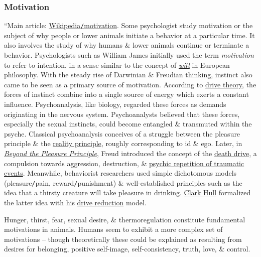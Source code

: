 \documentclass[oneside]{book}
\numberwithin{equation}{section}
\begin{document}
\subsubsection{Motivation}
``Main article: \href{https://en.wikipedia.org/wiki/Motivation}{Wikipedia\texttt{/}motivation}. Some psychologist study motivation or the subject of why people or lower animals initiate a behavior at a particular time. It also involves the study of why humans \& lower animals continue or terminate a behavior. Psychologists such as William James initially used the term \textit{motivation} to refer to intention, in a sense similar to the concept of \href{https://en.wikipedia.org/wiki/Will_(philosophy)}{\textit{will}} in European philosophy. With the steady rise of Darwinian \& Freudian thinking, instinct also came to be seen as a primary source of motivation. According to \href{https://en.wikipedia.org/wiki/Drive_theory}{drive theory}, the forces of instinct combine into a single source of energy which exerts a constant influence. Psychoanalysis, like biology, regarded these forces as demands originating in the nervous system. Psychoanalysts believed that these forces, especially the sexual instincts, could become entangled \& transmuted within the psyche. Classical psychoanalysis conceives of a struggle between the pleasure principle \& the \href{https://en.wikipedia.org/wiki/Reality_principle}{reality principle}, roughly corresponding to id \& ego. Later, in \href{https://en.wikipedia.org/wiki/Beyond_the_Pleasure_Principle}{\textit{Beyond the Pleasure Principle}}, Freud introduced the concept of the \href{https://en.wikipedia.org/wiki/Death_drive}{death drive}, a compulsion towards aggression, destruction, \& \href{https://en.wikipedia.org/wiki/Repetition_compulsion}{psychic repetition of traumatic events}. Meanwhile, behaviorist researchers used simple dichotomous models (pleasure\texttt{/}pain, reward\texttt{/}punishment) \& well-established principles such as the idea that a thirsty creature will take pleasure in drinking. \href{https://en.wikipedia.org/wiki/Clark_Hull}{Clark Hull} formalized the latter idea with his \href{https://en.wikipedia.org/wiki/Drive_reduction_theory_(learning_theory)}{drive reduction} model.

Hunger, thirst, fear, sexual desire, \& thermoregulation constitute fundamental motivations in animals. Humans seem to exhibit a more complex set of motivations -- though theoretically these could be explained as resulting from desires for belonging, positive self-image, self-consistency, truth, love, \& control.
\end{document}
